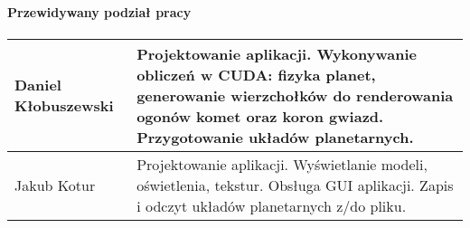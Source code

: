 \documentclass[a4paper,titlepage,10pt]{article}
\begin{document}
%        

	\paragraph{Przewidywany podział pracy}
	
	\paragraph{}
	\begin{tabular}{|l|p{10cm}|}
	\hline
	Daniel Kłobuszewski & Projektowanie aplikacji. Wykonywanie obliczeń w CUDA: fizyka planet, generowanie wierzchołków do renderowania ogonów komet oraz koron gwiazd. Przygotowanie układów planetarnych.\\\hline
	Jakub Kotur & Projektowanie aplikacji. Wyświetlanie modeli, oświetlenia, tekstur. Obsługa GUI aplikacji. Zapis i odczyt układów planetarnych z/do pliku.\\\hline
	\end{tabular}
\end{document}
